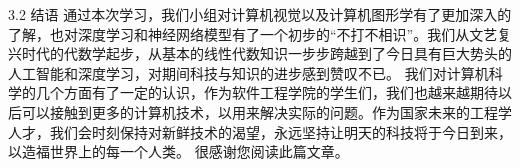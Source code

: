 3.2 结语
	通过本次学习，我们小组对计算机视觉以及计算机图形学有了更加深入的了解，也对深度学习和神经网络模型有了一个初步的“不打不相识”。我们从文艺复兴时代的代数学起步，从基本的线性代数知识一步步跨越到了今日具有巨大势头的人工智能和深度学习，对期间科技与知识的进步感到赞叹不已。
	我们对计算机科学的几个方面有了一定的认识，作为软件工程学院的学生们，我们也越来越期待以后可以接触到更多的计算机技术，以用来解决实际的问题。作为国家未来的工程学人才，我们会时刻保持对新鲜技术的渴望，永远坚持让明天的科技将于今日到来，以造福世界上的每一个人类。
	很感谢您阅读此篇文章。































